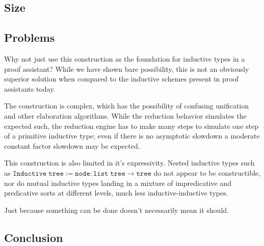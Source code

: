 \documentclass[a4paper,UKenglish,cleveref,nameinlink,autoref,thm-restate]{lipics-v2019}
\begin{document}
\subsection{Size}

\subsection{Problems}
Why not just use this construction as the foundation for inductive types in a proof assistant? While we have shown bare possibility, this is not an obviously superior solution when compared to the inductive schemes present in proof assistants today.

The construction is complex, which has the possibility of confusing unification and other elaboration algorithms. While the reduction behavior simulates the expected such, the reduction engine has to make many steps to simulate one step of a primitive inductive type; even if there is no asymptotic slowdown a moderate constant factor slowdown may be expected.

This construction is also limited in it's expressivity. Nested inductive types such as $\mathtt{Inductive}\;\mathtt{tree} := \mathtt{node} : \mathtt{list}\;\mathtt{tree} \to \mathtt{tree}$ do not appear to be constructible, nor do mutual inductive types landing in a mixture of impredicative and predicative sorts at different levels, much less inductive-inductive types.

Just because something can be done doesn't necessarily mean it should.

\subsection{Conclusion}





\appendix
\end{document}
